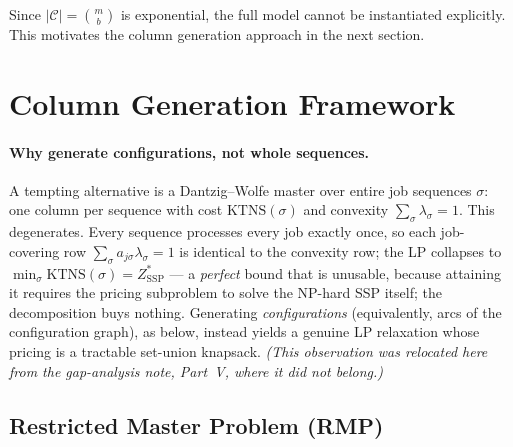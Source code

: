 \documentclass[11pt,a4paper]{article}
\theoremstyle{plain}
\theoremstyle{definition}
\begin{document}
\noindent Since $|\mathcal{C}| = \binom{m}{b}$ is exponential, the full model
cannot be instantiated explicitly. This motivates the column generation approach
in the next section.

\section{Column Generation Framework}
\label{sec:cg}

\paragraph{Why generate configurations, not whole sequences.}
A tempting alternative is a Dantzig--Wolfe master over entire job sequences
$\sigma$: one column per sequence with cost $\mathrm{KTNS}(\sigma)$ and convexity
$\sum_\sigma \lambda_\sigma = 1$. This degenerates. Every sequence processes every
job exactly once, so each job-covering row $\sum_\sigma a_{j\sigma}\lambda_\sigma = 1$
is identical to the convexity row; the LP collapses to
$\min_\sigma \mathrm{KTNS}(\sigma) = Z^{*}_{\mathrm{SSP}}$ ---
a \emph{perfect} bound that is unusable, because attaining it requires the
pricing subproblem to solve the NP-hard SSP itself; the decomposition buys
nothing. Generating
\emph{configurations} (equivalently, arcs of the configuration graph), as below, instead
yields a genuine LP relaxation whose pricing is a tractable set-union knapsack.
\emph{(This observation was relocated here from the gap-analysis note, Part~V, where it
did not belong.)}

\subsection{Restricted Master Problem (RMP)}
\end{document}
